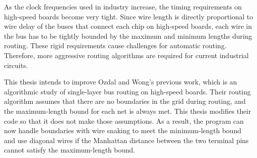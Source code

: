 As the clock frequencies used in industry increase, the timing requirements on high-speed boards become very tight. Since wire length is directly proportional to wire delay of the buses that connect each chip on high-speed boards, each wire in the bus has to be tightly bounded by the maximum and minimum lengths during routing. These rigid requirements cause challenges for automatic routing. Therefore, more aggressive routing algorithms are required for current industrial circuits. 

This thesis intends to improve Ozdal and Wong's previous work, which is an algorithmic study of single-layer bus routing on high-speed boards. Their routing algorithm assumes that there are no boundaries in the grid during routing, and the maximum-length bound for each net is always met. This thesis modifies their code so that it does not make those assumptions. As a result, the program can now handle boundaries with wire snaking to meet the minimum-length bound and use diagonal wires if the Manhattan distance between the two terminal pins cannot satisfy the maximum-length bound.
